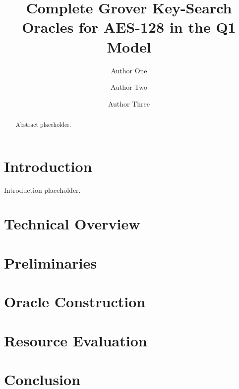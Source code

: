 \documentclass[runningheads]{llncs}
\newif\ifanonymous
\begin{document}
\title{Complete Grover Key-Search Oracles for AES-128 in the Q1 Model}

\ifanonymous
  \author{Anonymous Submission}
  \institute{}
\else
  \author{Author One \and Author Two \and Author Three}
\fi

\maketitle

\begin{abstract}
  Abstract placeholder.
\end{abstract}

\section{Introduction}\label{sec:introduction}

Introduction placeholder.

\section{Technical Overview}\label{sec:overview}

\section{Preliminaries}\label{sec:preliminaries}

\section{Oracle Construction}\label{sec:oracle}

\section{Resource Evaluation}\label{sec:evaluation}

\section{Conclusion}\label{sec:conclusion}
\end{document}
